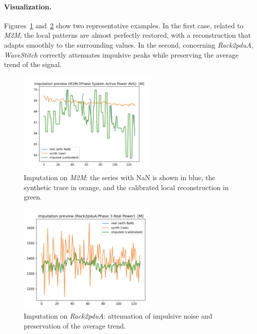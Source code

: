 \paragraph{Visualization.}
Figures~\ref{fig:m2m_imputation} and~\ref{fig:rack2pdua_imputation} show two representative examples.  
In the first case, related to \emph{M2M}, the local patterns are almost perfectly restored, with a reconstruction that adapts smoothly to the surrounding values.  
In the second, concerning \emph{Rack2pduA}, \emph{WaveStitch} correctly attenuates impulsive peaks while preserving the average trend of the signal.

\begin{figure}[H]
\centering
\includegraphics[width=0.60\textwidth]{images/Screenshot 2025-10-05 at 18.51.15}
\caption{Imputation on \emph{M2M}: the series with NaN is shown in blue, the synthetic trace in orange, and the calibrated local reconstruction in green.}
\label{fig:m2m_imputation}
\end{figure}

\begin{figure}[H]
\centering
\includegraphics[width=0.60\textwidth]{images/Screenshot 2025-10-05 at 18.53.03}
\caption{Imputation on \emph{Rack2pduA}: attenuation of impulsive noise and preservation of the average trend.}
\label{fig:rack2pdua_imputation}
\end{figure}

